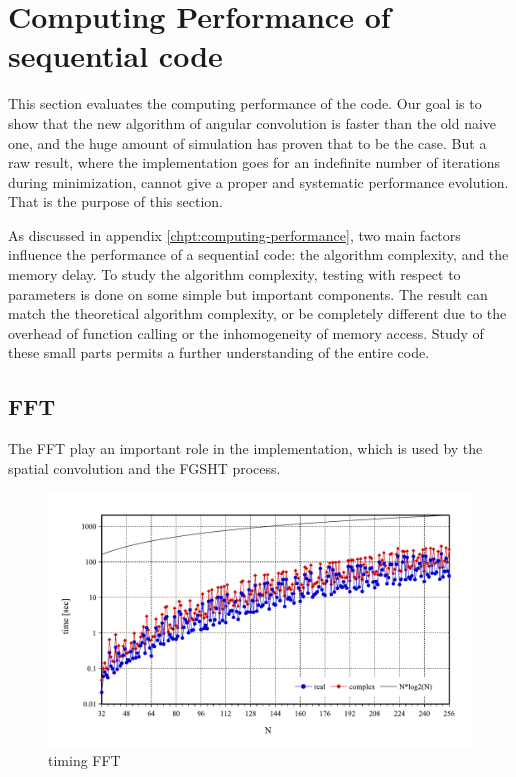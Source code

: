 
\chapter{Computing Performance of sequential code\label{chpt:seq-code-performance}}

This section evaluates the computing performance of the code. Our
goal is to show that the new algorithm of angular convolution is faster
than the old naive one, and the huge amount of simulation has proven
that to be the case. But a raw result, where the implementation
goes for an indefinite number of iterations during minimization, cannot %
give a proper and systematic performance evolution. That is the 
purpose of this section. 

As discussed in appendix \ref{chpt:computing-performance}, two main
factors influence the performance of a sequential code: the
algorithm complexity, and the memory delay. To study the algorithm
complexity, testing with respect to parameters is done on some simple
but important components. The result can match the theoretical algorithm
complexity, or be completely different due to the overhead of function
calling or the inhomogeneity of memory access. Study of these small %
parts permits a further understanding of the entire code.

\section{FFT}

The \acs{FFT} play an important role in the implementation, which
is used by the spatial convolution and the \acs{FGSHT} process. 

\begin{figure}[H]
\begin{centering}
\includegraphics[bb=0bp 20bp 567bp 310bp,width=1\columnwidth]{_figure/results/fftw_timing}
\par\end{centering}
\caption{timing FFT\label{fig:timing-FFT}}
\end{figure}


